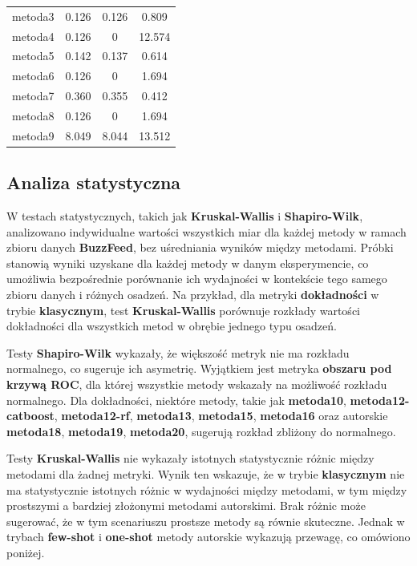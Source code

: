\begin{table}[H]
\begin{tabular}{lccc}
		metoda3           & 0.126         & 0.126            & 0.809          \\
		metoda4           & 0.126         &   0              & 12.574         \\
		metoda5           & 0.142         & 0.137            & 0.614          \\
		metoda6           & 0.126         &   0              & 1.694          \\
		metoda7           & 0.360         & 0.355            & 0.412          \\
		metoda8           & 0.126         &   0              & 1.694          \\
		metoda9           & 8.049         & 8.044            & 13.512         \\
		\bottomrule
	\end{tabular}
\end{table}

\subsection{Analiza statystyczna}
W testach statystycznych, takich jak \textbf{Kruskal-Wallis} i \textbf{Shapiro-Wilk}, analizowano indywidualne wartości wszystkich miar dla każdej metody w ramach zbioru danych \textbf{BuzzFeed}, bez uśredniania wyników między metodami. Próbki stanowią wyniki uzyskane dla każdej metody w danym eksperymencie, co umożliwia bezpośrednie porównanie ich wydajności w kontekście tego samego zbioru danych i różnych osadzeń. Na przykład, dla metryki \textbf{dokładności} w trybie \textbf{klasycznym}, test \textbf{Kruskal-Wallis} porównuje rozkłady wartości dokładności dla wszystkich metod w obrębie jednego typu osadzeń.

Testy \textbf{Shapiro-Wilk} wykazały, że większość metryk nie ma rozkładu normalnego, co sugeruje ich asymetrię. Wyjątkiem jest metryka \textbf{obszaru pod krzywą ROC}, dla której wszystkie metody wskazały na możliwość rozkładu normalnego. Dla dokładności, niektóre metody, takie jak \textbf{metoda10}, \textbf{metoda12-catboost}, \textbf{metoda12-rf}, \textbf{metoda13}, \textbf{metoda15}, \textbf{metoda16} oraz autorskie \textbf{metoda18}, \textbf{metoda19}, \textbf{metoda20}, sugerują rozkład zbliżony do normalnego.

Testy \textbf{Kruskal-Wallis} nie wykazały istotnych statystycznie różnic między metodami dla żadnej metryki. Wynik ten wskazuje, że w trybie \textbf{klasycznym} nie ma statystycznie istotnych różnic w wydajności między metodami, w tym między prostszymi a bardziej złożonymi metodami autorskimi. Brak różnic może sugerować, że w tym scenariuszu prostsze metody są równie skuteczne. Jednak w trybach \textbf{few-shot} i \textbf{one-shot} metody autorskie wykazują przewagę, co omówiono poniżej.

